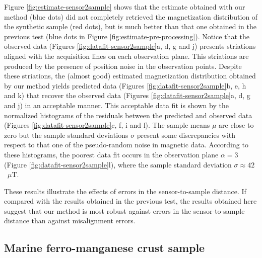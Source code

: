 \documentclass[galley,gc]{agutex}
\begin{document}
\begin{article}
Figure \ref{fig:estimate-sensor2sample} shows that
the estimate obtained with our method (blue dots) did not
completely retrieved the magnetization distribution of the synthetic
sample (red dots), but is much better than that one obtained in the
previous test (blue dots in Figure \ref{fig:estimate-pre-processing}).
Notice that the observed data (Figures \ref{fig:datafit-sensor2sample}a, 
d, g and j) presents striations aligned with the acquisition lines
on each observation plane. This striations are produced by the
presence of position noise in the observation points.
Despite these striations, the (almost good) estimated magnetization 
distribution obtained by our method yields 
predicted data (Figures \ref{fig:datafit-sensor2sample}b, e, h and k) 
that recover the observed data (Figures \ref{fig:datafit-sensor2sample}a, 
d, g and j) in an acceptable manner.
This acceptable data fit is shown by the normalized histograms of 
the residuals between the predicted and
observed data (Figures \ref{fig:datafit-sensor2sample}c, f, i and l).
The sample means $\mu$ are close to zero but the sample standard 
deviations $\sigma$ present some discrepancies with respect to
that one of the pseudo-random noise in magnetic data.
According to these histograms, the poorest data fit occurs in the 
observation plane $\alpha = 3$ (Figure \ref{fig:datafit-sensor2sample}l),
where the sample standard deviation $\sigma \approx 42$~$\mu$T.

These results illustrate the effects of errors in the sensor-to-sample
distance.
If compared with the results obtained in the previous test, 
the results obtained here suggest that our method is most robust against errors in
the sensor-to-sample distance than against misalignment errors.

\subsection{Marine ferro-manganese crust sample}
\label{subsec:Marine ferro-manganese crust sample}


\end{article}
\end{document}
